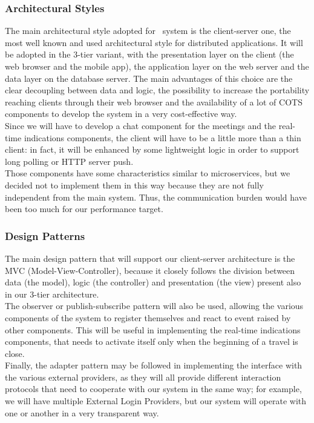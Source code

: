 \subsubsection{Architectural Styles}

The main architectural style adopted for \projectname~system is the client-server one, the most well known and used architectural style for
distributed applications. It will be adopted in the 3-tier variant, with the presentation layer on the client (the web browser and the mobile app), the application layer on the web server and the data layer on the database server. The main advantages of this choice are the clear decoupling between data and logic, the possibility to increase the portability reaching clients through their web browser and the availability of a lot of COTS components to develop the system in a very cost-effective way. \\
Since we will have to develop a chat component for the meetings and the real-time indications components, the client will have to be a little more than a thin client: in fact, it will be enhanced by some lightweight logic in order to support long polling or HTTP server push. \\
Those components have some characteristics similar to microservices, but we decided not to implement them in this way because they are not fully independent from the main system. Thus, the communication burden would have been too much for our performance target. \\

\subsubsection{Design Patterns}

The main design pattern that will support our client-server architecture is the MVC (Model-View-Controller), because it closely follows the division between data (the model), logic (the controller) and presentation (the view) present also in our 3-tier architecture. \\
The observer or publish-subscribe pattern will also be used, allowing the various components of the system to register themselves and react to event raised by other components. This will be useful in implementing the real-time indications components, that needs to activate itself only when the beginning of a travel is close. \\
Finally, the adapter pattern may be followed in implementing the interface with the various external providers, as they will all provide different interaction protocols that need to cooperate with our system in the same way; for example, we will have multiple External Login Providers, but our system will operate with one or another in a very transparent way. \\